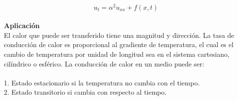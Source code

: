 \documentclass[10pt,a4paper]{report}
\begin{document}
\\ \Large $$\displaystyle u_t=\alpha^2 u_{xx} + f(x,t)$$
\\ \textbf {Aplicación}
\\El calor que puede ser transferido tiene una magnitud y dirección. La tasa de conducción de calor es proporcional al gradiente de temperatura, el cual es el cambio de temperatura por unidad de longitud sea en el sistema cartesiano, cilíndrico o esférico. La conducción de calor en un medio puede ser:
\\\\ 1. Estado estacionario si la temperatura no cambia con el tiempo.
\\ 2. Estado transitorio si cambia con respecto al tiempo.
\end{document}
